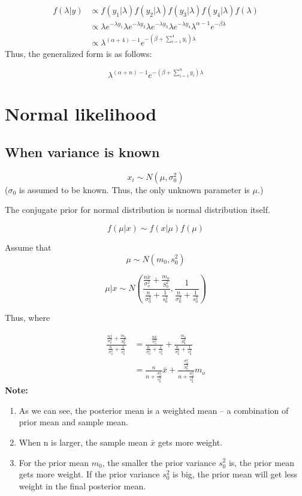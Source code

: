 \documentclass[]{book}
\begin{document}
\[\begin{aligned} f(\lambda | y) &\propto f(y_1|\lambda)f(y_2|\lambda)f(y_3|\lambda)f(y_4|\lambda)    f(\lambda) \\ &\propto \lambda e^{-\lambda y_1} \lambda e^{-\lambda y_2}\lambda e^{-\lambda y_3} \lambda e^{-\lambda y_4}   \lambda^{\alpha-1}e^{-\beta \lambda} \\ &\propto \lambda^{(\alpha+4)-1} e^{-(\beta+\sum_{i=1}^4 y_i)\lambda } \end{aligned}\]
Thus, the generalized form is as follows:

\[\lambda^{(\alpha+n)-1} e^{-(\beta+\sum_{i=1}^n y_i)\lambda }\]

\hypertarget{normal-likelihood}{%
\section{Normal likelihood}\label{normal-likelihood}}

\hypertarget{when-variance-is-known}{%
\subsection{When variance is known}\label{when-variance-is-known}}

\[x_i \sim N(\mu, \sigma_0^2)\]
(\(\sigma_0\) is assumed to be known. Thus, the only unknown parameter is \(\mu\).)

The conjugate prior for normal distribution is normal distribution itself.

\[f(\mu |x) \sim f(x|\mu) f(\mu)\]

Assume that
\[\mu \sim N(m_0,s_0^2)\]

\[\mu|x \sim N(\frac{\frac{n \bar{x}}{\sigma_o^2}+\frac{m_o}{S_0^2}}{\frac{n}{\sigma_0^2}+\frac{1}{s_0^2}},\frac{1}{\frac{n}{\sigma_0^2}+\frac{1}{s_0^2}})\]

Thus, where

\[\begin{aligned} \frac{\frac{n \bar{x}}{\sigma_o^2}+\frac{m_o}{S_0^2}}{\frac{n}{\sigma_0^2}+\frac{1}{s_0^2}}&=\frac{\frac{n \bar{x}}{\sigma_o^2}}{\frac{n}{\sigma_0^2}+\frac{1}{s_0^2}}+\frac{\frac{m_o}{S_0^2}}{\frac{n}{\sigma_0^2}+\frac{1}{s_0^2}}\\ &=\frac{n}{n+\frac{\sigma_0^2}{s_0^2}} \bar{x}+\frac{\frac{\sigma_0^2}{S_0^2}}{n+\frac{\sigma_0^2}{s_0^2}}m_o \end{aligned}\]
\textbf{Note:}

\begin{enumerate}
\def\labelenumi{(\arabic{enumi})}
\item
  As we can see, the posterior mean is a weighted mean -- a combination of prior mean and sample mean.
\item
  When n is larger, the sample mean \(\bar{x}\) gets more weight.
\item
  For the prior mean \(m_0\), the smaller the prior variance \(s_0^2\) is, the prior mean gets more weight. If the prior variance \(s_0^2\) is big, the prior mean will get less weight in the final posterior mean.
\end{enumerate}
\end{document}

